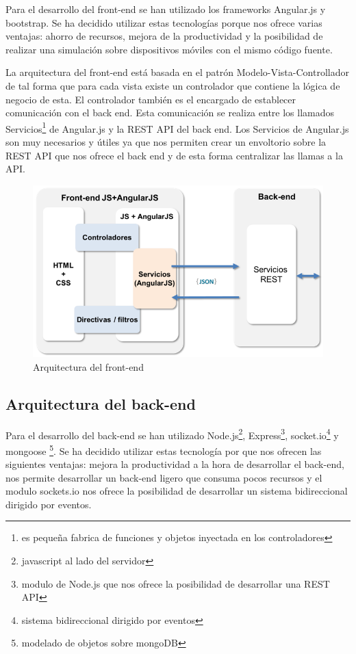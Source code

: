 Para el desarrollo del front-end se han utilizado los frameworks Angular.js y bootstrap. Se ha decidido utilizar estas tecnologías porque nos ofrece varias ventajas: ahorro de recursos, mejora de la productividad y la posibilidad de realizar una simulación sobre dispositivos móviles con el mismo código fuente.

La arquitectura del front-end está basada en el patrón Modelo-Vista-Controllador de tal forma que para cada vista existe un controlador que contiene la lógica de negocio de esta. El controlador también es el encargado de establecer comunicación con el back end. Esta comunicación se realiza entre los llamados Servicios\footnote{es pequeña fabrica de funciones y objetos inyectada en los controladores} de Angular.js y la REST API del back end. Los Servicios de Angular.js son muy necesarios y útiles ya que nos permiten crear un envoltorio sobre la REST API que nos ofrece el back end y de esta forma centralizar las llamas a la API.

\begin{figure}[H]
\centering\includegraphics[scale=0.5]{imagenes/arquitectura-front-end.png}
\caption{Arquitectura del front-end}
\label{arquitecturaFrontEnd}
\end{figure}

\subsection{Arquitectura del back-end}

Para el desarrollo del back-end se han utilizado Node.js\footnote{javascript al lado del servidor}, Express\footnote{modulo de Node.js que nos ofrece la posibilidad de desarrollar una REST API}, socket.io\footnote{sistema bidireccional dirigido por eventos} y mongoose \footnote{modelado de objetos sobre mongoDB}. Se ha decidido utilizar estas tecnología por que nos ofrecen las siguientes ventajas: mejora la productividad a la hora de desarrollar el back-end, nos permite desarrollar un back-end ligero que consuma pocos recursos y el modulo sockets.io nos ofrece la posibilidad de desarrollar un sistema bidireccional dirigido por eventos.


